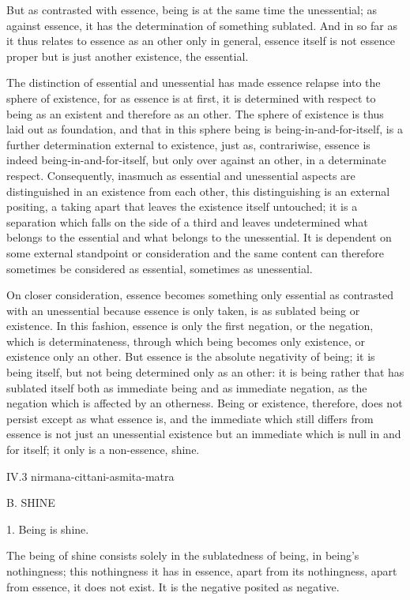 But as contrasted with essence,
being is at the same time the unessential;
as against essence, it has the determination of something sublated.
And in so far as it thus relates to essence
as an other only in general,
essence itself is not essence proper
but is just another existence, the essential.

The distinction of essential and unessential has
made essence relapse into the sphere of existence,
for as essence is at first,
it is determined with respect to being
as an existent and therefore as an other.
The sphere of existence is thus laid out as foundation,
and that in this sphere being is being-in-and-for-itself,
is a further determination external to existence,
just as, contrariwise, essence is indeed being-in-and-for-itself,
but only over against an other, in a determinate respect.
Consequently, inasmuch as essential and unessential aspects are
distinguished in an existence from each other,
this distinguishing is an external positing,
a taking apart that leaves the existence itself untouched;
it is a separation which falls on the side of
a third and leaves undetermined
what belongs to the essential
and what belongs to the unessential.
It is dependent on some external standpoint or consideration
and the same content can therefore sometimes be considered
as essential, sometimes as unessential.

On closer consideration, essence becomes something
only essential as contrasted with an unessential
because essence is only taken,
is as sublated being or existence.
In this fashion, essence is only the first negation,
or the negation, which is determinateness,
through which being becomes only existence,
or existence only an other.
But essence is the absolute negativity of being;
it is being itself, but not being determined only as an other:
it is being rather that has sublated itself
both as immediate being
and as immediate negation,
as the negation which is affected by an otherness.
Being or existence, therefore, does not persist
except as what essence is,
and the immediate which still differs from essence is not just
an unessential existence but an immediate
which is null in and for itself;
it only is a non-essence, shine.

IV.3
nirmana-cittani-asmita-matra

B. SHINE

1. Being is shine.

The being of shine consists solely
in the sublatedness of being,
in being's nothingness;
this nothingness it has in essence,
apart from its nothingness,
apart from essence, it does not exist.
It is the negative posited as negative.

